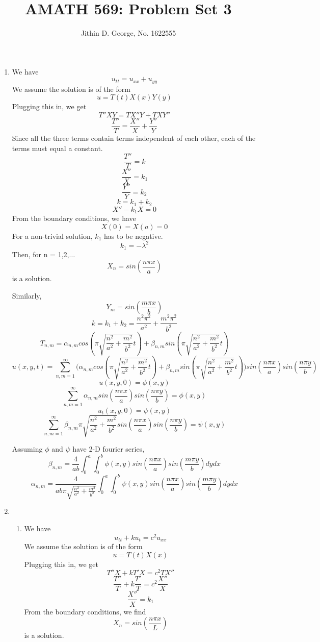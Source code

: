 \documentclass[a4paper,12 pt]{article}
\title{AMATH 569: Problem Set 3}
\author{Jithin D. George, No. 1622555}
\begin{document}
\maketitle
\begin{enumerate}

	
	\item We have 
	\[ u_{tt} = u_{xx}+ u_{yy}\]
	We assume the solution is of the form 
	\[u = T(t)X(x)Y(y)\]
	Plugging this in, we get
	\[T''XY=TX''Y +TXY'' \]
	\[\frac{T''}{T}= \frac{X''}{X}+ \frac{Y''}{Y}\]
	Since all the three terms contain terms independent of each other, each of the terms must equal a constant.
	\[\frac{T''}{T}= k\]
	\[ \frac{X''}{X}=k_1\]
	\[\frac{Y''}{Y}=k_2\]
	\[k=k_1 +k_2\]
	\[X'' -k_1 X=0\]
	From the boundary conditions, we have
	\[ X(0)= X(a)=0\]
	For a non-trivial solution, $k_1$ has to be negative.
	\[ k_1 = -\lambda^2\]
	Then, for n = 1,2,$\ldots$
	\[ X_n = sin(\frac{n\pi x}{a})\]
	is a solution.
	
	Similarly,
	\[ Y_m = sin(\frac{m\pi x}{b})\]
	\[k = k_1 +k_2 = \frac{n^2\pi^2}{a^2} + \frac{m^2\pi^2}{b^2}\]
	\[T_{n,m} = \alpha_{n,m} cos(\pi\sqrt{\frac{n^2}{a^2} +\frac{m^2}{b^2}}t)+\beta_{n,m} sin(\pi\sqrt{\frac{n^2}{a^2} +\frac{m^2}{b^2}}t)\]
	\[u(x,y,t)= \sum_{n,m=1}^{\infty}\big(\alpha_{n,m} cos(\pi\sqrt{\frac{n^2}{a^2} +\frac{m^2}{b^2}}t)+\beta_{n,m} sin(\pi\sqrt{\frac{n^2}{a^2} +\frac{m^2}{b^2}}t)\big)sin(\frac{n\pi x}{a})sin(\frac{n\pi y}{b}) \]
	\[u(x,y,0)= \phi(x,y)\]
	\[\sum_{n,m=1}^{\infty}\alpha_{n,m} sin(\frac{n\pi x}{a})sin(\frac{n\pi y}{b})= \phi(x,y) \]
	\[u_t(x,y,0)= \psi(x,y)\]
	\[\sum_{n,m=1}^{\infty}\beta_{n,m}\pi\sqrt{\frac{n^2}{a^2} +\frac{m^2}{b^2}} sin(\frac{n\pi x}{a})sin(\frac{n\pi y}{b})= \psi(x,y) \]
	
	Assuming $\phi$ and $\psi$ have 2-D fourier series,
	\[\beta_{n,m} = \frac{4}{ab}\int_{0}^{a}\int_{0}^{b}\phi(x,y)sin(\frac{n\pi x}{a})sin(\frac{m\pi y}{b})dy dx \]
	\[\alpha_{n,m} = \frac{4}{ab\pi\sqrt{\frac{n^2}{a^2} +\frac{m^2}{b^2}}}\int_{0}^{a}\int_{0}^{b}\psi(x,y)sin(\frac{n\pi x}{a})sin(\frac{m\pi y}{b})dy dx \]
\item
\begin{enumerate}
	\item

 We have 
 \[ u_{tt}+ku_{t} = c^2 u_{xx}\]
 We assume the solution is of the form 
 \[u = T(t)X(x)\]
 Plugging this in, we get
 \[T''X+ kT'X =c^2TX'' \]
 \[\frac{T''}{T}+ k\frac{T'}{T}=c^2\frac{X''}{X}\]
 \[ \frac{X''}{X}=k_1\]
 From the boundary conditions, we find
\[ X_n = sin(\frac{n\pi x}{L})\]
is a solution. 


\end{enumerate}
\end{enumerate}
\end{document}
